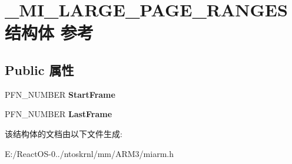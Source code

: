 \hypertarget{struct___m_i___l_a_r_g_e___p_a_g_e___r_a_n_g_e_s}{}\section{\+\_\+\+M\+I\+\_\+\+L\+A\+R\+G\+E\+\_\+\+P\+A\+G\+E\+\_\+\+R\+A\+N\+G\+E\+S结构体 参考}
\label{struct___m_i___l_a_r_g_e___p_a_g_e___r_a_n_g_e_s}
\subsection*{Public 属性}
\begin{DoxyCompactItemize}
\item 
\mbox{\label{struct___m_i___l_a_r_g_e___p_a_g_e___r_a_n_g_e_s_a9269ef4b94cd8fc05e7f9a610c5a73be}} 
P\+F\+N\+\_\+\+N\+U\+M\+B\+ER {\bfseries Start\+Frame}
\item 
\mbox{\label{struct___m_i___l_a_r_g_e___p_a_g_e___r_a_n_g_e_s_a14be73634027a195b8554c6a58526eb7}} 
P\+F\+N\+\_\+\+N\+U\+M\+B\+ER {\bfseries Last\+Frame}
\end{DoxyCompactItemize}


该结构体的文档由以下文件生成\+:\begin{DoxyCompactItemize}
\item 
E\+:/\+React\+O\+S-\/0../ntoskrnl/mm/\+A\+R\+M3/miarm.\+h\end{DoxyCompactItemize}
